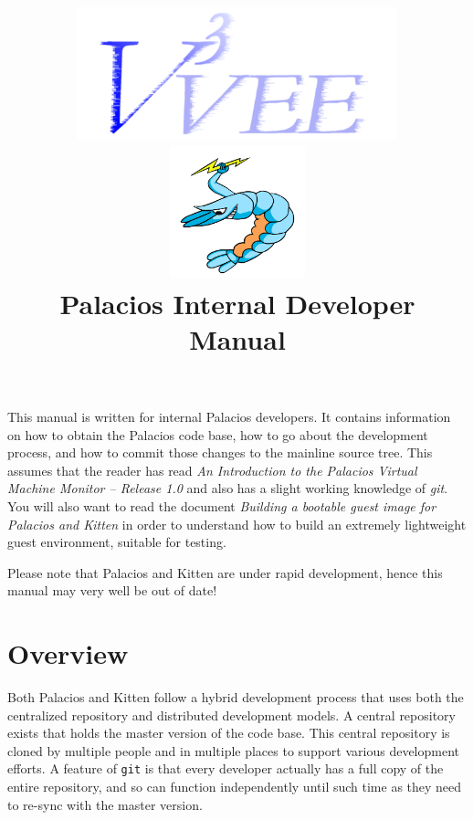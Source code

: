 \documentclass[11pt]{article}
\begin{document}
\title{
\includegraphics[height=1.5in]{v3vee.pdf}
\includegraphics[height=1.5in]{logo6.png} \\
\vspace{0.5in} 
Palacios Internal Developer Manual
}


\maketitle


This manual is written for internal Palacios developers. It contains
information on how to obtain the Palacios code base, how to go about
the development process, and how to commit those changes to the
mainline source tree.  This assumes that the reader has read {\em An
Introduction to the Palacios Virtual Machine Monitor -- Release 1.0}
and also has a slight working knowledge of {\em git}.  You will also
want to read the document {\em Building a bootable guest image for
Palacios and Kitten} in order to understand how to build an extremely
lightweight guest environment, suitable for testing.

Please note that Palacios and Kitten are under rapid development,
hence this manual may very well be out of date!

\newpage
\tableofcontents
\newpage
\listoffigures
\newpage

\section{Overview}


Both Palacios and Kitten follow a hybrid development process that
uses both the centralized repository and distributed development
models. A central repository exists that holds the master version of
the code base. This central repository is cloned by multiple people
and in multiple places to support various development efforts. A
feature of \texttt{git} is that every developer actually has a full copy of
the entire repository, and so can function independently until such
time as they need to re-sync with the master version. 
\end{document}
